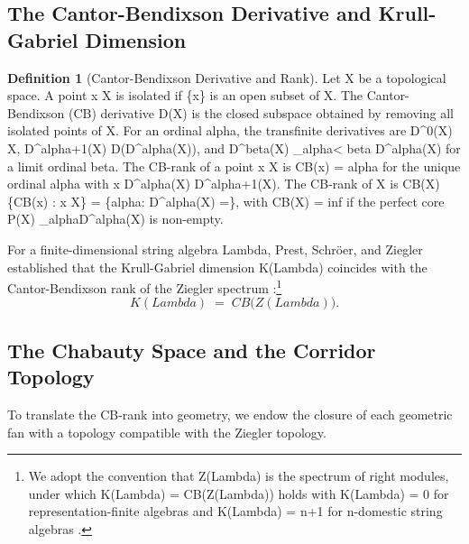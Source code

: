 \documentclass[11pt,a4paper,reqno]{amsart}
\def\({}%
\def\){}%
\def\mathcal#1{#1}%
\def\operatorname#1{#1}%
\def\Zg{Z}%
\def\KG{K}%
\def\CB{CB}%
\def\neq{\not=}%
\def\infty{inf}%
\def\gamma{gamma}%
\def\alpha{alpha}%
\def\beta{beta}%
\def\Lambda{Lambda}%
\def\emph#1{#1}%
\theoremstyle{definition}
\newtheorem{definition}[theorem]{Definition}
\theoremstyle{remark}
\newcommand{\Zg}{\operatorname{Zg}}
\newcommand{\CB}{\operatorname{CB}}
\newcommand{\KG}{\operatorname{KG}}
\begin{document}
\subsection{The Cantor-Bendixson Derivative and Krull-Gabriel Dimension}
\label{subsec:cb_derivative}

\begin{definition}[Cantor-Bendixson Derivative and Rank]
\label{def:cb_derivative}
Let \(X\) be a topological space. A point \(x \in X\) is \emph{isolated} if \(\{x\}\) is an open subset of \(X\). The \emph{Cantor-Bendixson (CB) derivative} \(D(X)\) is the closed subspace obtained by removing all isolated points of \(X\). For an ordinal \(\alpha\), the transfinite derivatives are \(D^0(X) \coloneqq X\), \(D^{\alpha+1}(X) \coloneqq D(D^\alpha(X))\), and \(D^\beta(X) \coloneqq \bigcap_{\alpha < \beta} D^\alpha(X)\) for a limit ordinal \(\beta\). The \emph{CB-rank} of a point \(x \in X\) is \(\CB(x) = \alpha\) for the unique ordinal \(\alpha\) with \(x \in D^\alpha(X) \setminus D^{\alpha+1}(X)\). The \emph{CB-rank of \(X\)} is \(\CB(X) \coloneqq \sup\{\CB(x) : x \in X\} = \sup\{\alpha : D^\alpha(X) \neq \emptyset\}\), with \(\CB(X) = \infty\) if the \emph{perfect core} \(\mathcal{P}(X) \coloneqq \bigcap_\alpha D^\alpha(X)\) is non-empty.
\end{definition}

For a finite-dimensional string algebra \(\Lambda\), Prest, Schr\"oer, and Ziegler established that the Krull-Gabriel dimension \(\KG(\Lambda)\) coincides with the Cantor-Bendixson rank of the Ziegler spectrum \cite{Ziegler1984, Schroer2000b, Prest2009}:\footnote{We adopt the convention that \(\Zg(\Lambda)\) is the spectrum of right modules, under which \(\KG(\Lambda) = \CB(\Zg(\Lambda))\) holds with \(\KG(\Lambda) = 0\) for representation-finite algebras and \(\KG(\Lambda) = n+1\) for \(n\)-domestic string algebras \cite{Schroer2000b, LPP2018}.}
\[
\KG(\Lambda) \;=\; \CB\bigl(\Zg(\Lambda)\bigr).
\]

\subsection{The Chabauty Space and the Corridor Topology}
\label{subsec:chabauty_corridor}

To translate the CB-rank into geometry, we endow the closure of each geometric fan \(\overline{\mathcal{F}_i} \coloneqq \overline{\mathcal{F}(\gamma_{P(S(i))})}\) with a topology compatible with the Ziegler topology.
\end{document}
